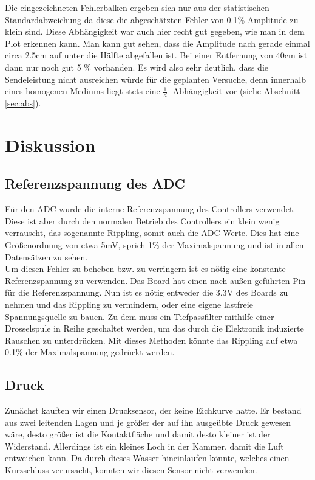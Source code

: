 \documentclass[12pt,a4paper,titlepage,headinclude,bibtotoc]{scrartcl}
\numberwithin{equation}{subsection}
\begin{document}
Die eingezeichneten Fehlerbalken ergeben sich nur aus der statistischen Standardabweichung da diese die abgeschätzten Fehler von 0.1\% Amplitude zu klein sind. Diese Abhängigkeit war auch hier recht gut gegeben, wie man in dem Plot erkennen kann. 
Man kann gut sehen, dass die Amplitude nach gerade einmal circa 2.5\si{\centi\meter} auf unter die Hälfte abgefallen ist. Bei einer Entfernung von 40\si{\centi\meter} ist dann nur noch gut 5 $\%$ vorhanden. Es wird also sehr deutlich, dass die Sendeleistung nicht ausreichen würde für die geplanten Versuche, denn innerhalb eines homogenen Mediums liegt stets eine $\frac{1}{d}$ -Abhängigkeit vor (siehe Abschnitt \ref{sec:abs}). 


\section{Diskussion}
\label{sec:diskussion}

\subsection{Referenzspannung des ADC}
\label{sec:diskreffADC}
Für den ADC wurde die interne Referenzspannung des Controllers verwendet.
Diese ist aber durch den normalen Betrieb des Controllers ein klein wenig verrauscht, das sogenannte Rippling, somit auch die ADC Werte.
Dies hat eine Größenordnung von etwa 5\si{\milli\volt}, sprich 1\% der Maximalspannung und ist in allen Datensätzen zu sehen.\\
Um diesen Fehler zu beheben bzw. zu verringern ist es nötig eine konstante Referenzspannung zu verwenden.
Das Board hat einen nach außen geführten Pin für die Referenzspannung.
Nun ist es nötig entweder die 3.3\si{\volt} des Boards zu nehmen und das Rippling zu vermindern, oder eine eigene lastfreie Spannungsquelle zu bauen.
Zu dem muss ein Tiefpassfilter mithilfe einer Drosselspule in Reihe geschaltet werden, um das durch die Elektronik induzierte Rauschen zu unterdrücken.
Mit dieses Methoden könnte das Rippling auf etwa 0.1\% der Maximalspannung gedrückt werden.

\subsection{Druck}
Zunächst kauften wir einen Drucksensor, der keine Eichkurve hatte.
Er bestand aus zwei leitenden Lagen und je größer der auf ihn ausgeübte Druck gewesen wäre, desto größer ist die Kontaktfläche und damit desto kleiner ist der Widerstand.
Allerdings ist ein kleines Loch in der Kammer, damit die Luft entweichen kann.
Da durch dieses Wasser hineinlaufen könnte, welches einen Kurzschluss verursacht, konnten wir diesen Sensor nicht verwenden.
\end{document}
